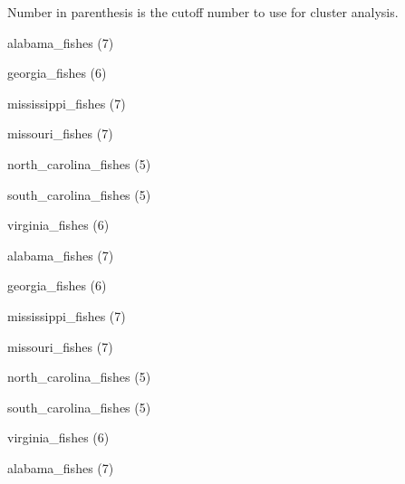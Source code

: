 \documentclass[11pt]{article}
\begin{document}
\thispagestyle{empty}

Number in parenthesis is the cutoff number to use for cluster analysis.

\begin{multicols}{2}
	\Large
alabama\_fishes (7)

\vspace{1\baselineskip}

georgia\_fishes (6)

\vspace{1\baselineskip}

mississippi\_fishes (7)

\vspace{1\baselineskip}

missouri\_fishes (7)

\vspace{1\baselineskip}

north\_carolina\_fishes (5)

\vspace{1\baselineskip}

south\_carolina\_fishes (5)

\vspace{1\baselineskip}

virginia\_fishes (6)

\vspace{1\baselineskip}

alabama\_fishes (7)

\vspace{1\baselineskip}

georgia\_fishes (6)

\vspace{1\baselineskip}

mississippi\_fishes (7)

\vspace{1\baselineskip}

missouri\_fishes (7)

\vspace{1\baselineskip}

north\_carolina\_fishes (5)

\vspace{1\baselineskip}

south\_carolina\_fishes (5)

\vspace{1\baselineskip}

virginia\_fishes (6)

\columnbreak

alabama\_fishes (7)


\end{multicols}
\end{document}
